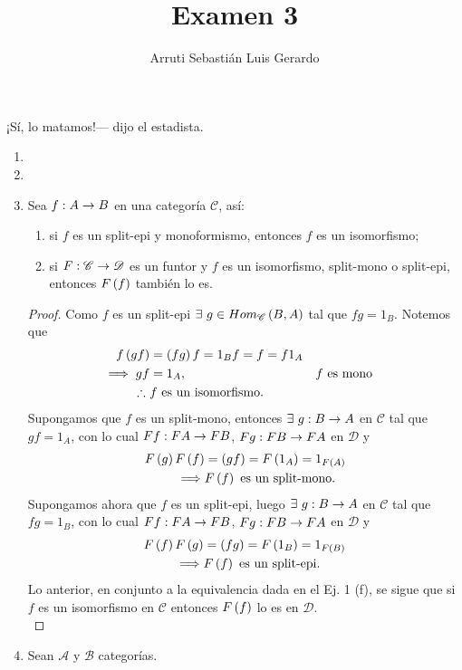 \documentclass{article}
\title{Examen 3}
\author{Arruti Sebastián Luis Gerardo}
\begin{document}
	¡Sí, lo matamos!--- dijo el estadista.
	\newpage
	\begin{enumerate}[label=\textbf{Ej \arabic*.}]
		\item 
		\item
		\item Sea $f:A\to B$ en una categoría $\mathscr{C}$, así:
		\begin{enumerate}
			\item si $f$ es un split-epi y monoformismo, entonces $f$ es un isomorfismo;
			\item si $F:\mathscr{C}\to \mathscr{D}$ es un funtor y $f$ es un isomorfismo, split-mono o split-epi, entonces $F\left(f\right)$ también lo es.
		\end{enumerate}
		\begin{proof}
			 Como $f$ es un split-epi $\exists\ g\in\ringmodhom{\mathscr{C}}{B}{A}$ tal que $fg=1_B$. Notemos que
			\begin{align*}
				f\left(gf\right)&=\left(fg\right)f=1_B f=f=f1_A\\
				\implies gf&=1_A, && f\text{ es mono}\\
				\therefore\ & f \text{ es un isomorfismo.}
			\end{align*}
			 Supongamos que $f$ es un split-mono, entonces $\exists\ \catarrow{g}{B}{A}$ en $\mathscr{C}$ tal que $gf=1_A$, con lo cual $Ff:FA\to FB$, $Fg:FB\to FA$ en $\mathscr{D}$ y
			\begin{align*}
				F\left(g\right)F\left(f\right)&=\left(gf\right)=F\left(1_A\right)=1_{F\left(A\right)}\\
				\implies & F\left(f\right)\text{ es un split-mono.}
			\end{align*}
			Supongamos ahora que $f$ es un split-epi, luego $\exists\ \catarrow{g}{B}{A}$ en $\mathscr{C}$ tal que $fg=1_B$, con lo cual $Ff:FA\to FB$, $Fg:FB\to FA$ en $\mathscr{D}$ y
			\begin{align*}
				F\left(f\right)F\left(g\right)&=\left(fg\right)=F\left(1_B\right)=1_{F\left(B\right)}\\
				\implies & F\left(f\right)\text{ es un split-epi.}
			\end{align*}   
			Lo anterior, en conjunto a la equivalencia dada en el Ej. 1 (f), se sigue que si $f$ es un isomorfismo en $\mathscr{C}$ entonces $F\left(f\right)$ lo es en $\mathscr{D}$.\\
		\end{proof}
		\item Sean $\mathscr{A}$ y $\mathscr{B}$ categorías.
		\begin{enumerate}

\end{enumerate}
\end{enumerate}
\end{document}
